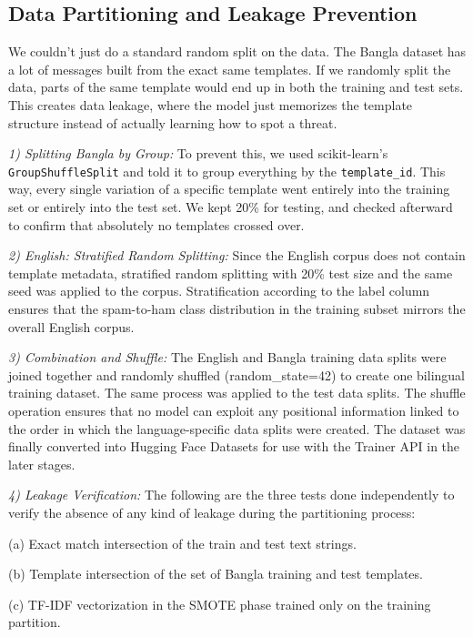 \documentclass[journal]{IEEEtran}
\begin{document}
\subsection{Data Partitioning and Leakage Prevention}

We couldn't just do a standard random split on the data. The Bangla dataset has a lot of messages built from the exact same templates. If we randomly split the data, parts of the same template would end up in both the training and test sets. This creates data leakage, where the model just memorizes the template structure instead of actually learning how to spot a threat.

\textit{1) Splitting Bangla by Group:} To prevent this, we used scikit-learn's \texttt{GroupShuffleSplit} and told it to group everything by the \texttt{template\_id}. This way, every single variation of a specific template went entirely into the training set or entirely into the test set. We kept 20\% for testing, and checked afterward to confirm that absolutely no templates crossed over.

\textit{2) English: Stratified Random Splitting:} Since the English corpus
does not contain template metadata, stratified random splitting with 20\%
test size and the same seed was applied to the corpus. Stratification
according to the label column ensures that the spam-to-ham class distribution in the training subset mirrors the overall English corpus.

\textit{3) Combination and Shuffle:} The English and Bangla training data
splits were joined together and randomly shuffled (random\_state=42) to
create one bilingual training dataset. The same process was applied to
the test data splits. The shuffle operation ensures that no model can
exploit any positional information linked to the order in
which the language-specific data splits were created. The dataset was
finally converted into Hugging Face Datasets for use with the Trainer
API in the later stages.

\textit{4) Leakage Verification:} The following are the three tests done
independently to verify the absence of any kind of leakage during the
partitioning process:

(a) Exact match intersection of the train and test text strings.

(b) Template intersection of the set of Bangla training and test
templates.

(c) TF-IDF vectorization in the SMOTE phase trained only on the
training partition.
\end{document}
